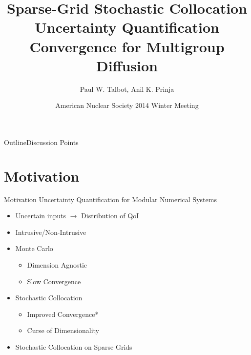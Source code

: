 \documentclass{beamer}
\title[SC UQ for Multigroup Neutron Diffusion] %
{Sparse-Grid Stochastic Collocation Uncertainty Quantification Convergence for Multigroup Diffusion}
\author[Talbot] %
{Paul W. Talbot\inst{1}, Anil K. Prinja\inst{1}}
\institute[University of New Mexico] %
{
  \inst{1}%
  University of New Mexico\\
   \vspace{10pt}
\footnotesize{Supported by Idaho National Laboratory}
}
\date[ANS Winter, 2014] %
{American Nuclear Society 2014 Winter Meeting}
\begin{document}
\begin{frame}
  \titlepage
\end{frame}

\begin{frame}{Outline}{Discussion Points}\vspace{-20pt}
  \tableofcontents%
\end{frame}

\section{Motivation}
\begin{frame}{Motivation}\vspace{-30pt}
Uncertainty Quantification for Modular Numerical Systems\vspace{5pt}
\begin{itemize}
  \item Uncertain inputs $\to$ Distribution of QoI
  \item Intrusive/Non-Intrusive\vspace{5pt}
  \item Monte Carlo
  \begin{itemize}
    \item Dimension Agnostic
    \item Slow Convergence
  \end{itemize}\vspace{5pt}
  \item Stochastic Collocation
  \begin{itemize}
    \item Improved Convergence*
    \item Curse of Dimensionality
  \end{itemize}\vspace{5pt}
  \item Stochastic Collocation on Sparse Grids
\end{itemize}
\end{frame}
\end{document}
